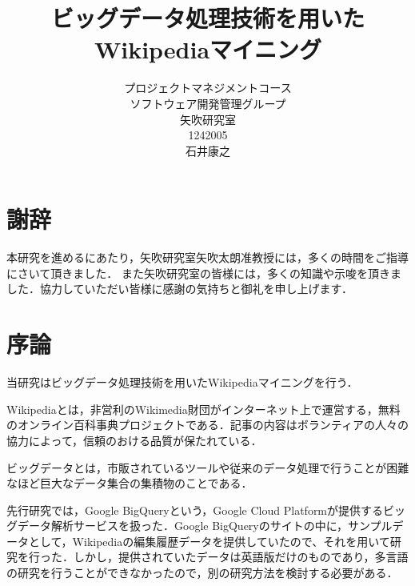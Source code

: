 \usepackage{here}

\title{ビッグデータ処理技術を用いた\\
Wikipediaマイニング}
\author{プロジェクトマネジメントコース\\
ソフトウェア開発管理グループ\\
矢吹研究室\\
1242005\\
石井康之}
\date{}

\maketitle



\chapter*{謝辞}

本研究を進めるにあたり，矢吹研究室矢吹太朗准教授には，多くの時間をご指導にさいて頂きました．
また矢吹研究室の皆様には，多くの知識や示唆を頂きました．協力していただい皆様に感謝の気持ちと御礼を申し上げます．

\tableofcontents%

\chapter{序論}

当研究はビッグデータ処理技術を用いたWikipediaマイニングを行う．

Wikipediaとは，非営利のWikimedia財団がインターネット上で運営する，無料のオンライン百科事典プロジェクトである．記事の内容はボランティアの人々の協力によって，信頼のおける品質が保たれている．

ビッグデータとは，市販されているツールや従来のデータ処理で行うことが困難なほど巨大なデータ集合の集積物のことである．

先行研究では，{Google BigQuery}という，{Google Cloud Platform}が提供するビッグデータ解析サービスを扱った．{Google BigQuery}のサイトの中に，サンプルデータとして，Wikipediaの編集履歴データを提供していたので、それを用いて研究を行った．しかし，提供されていたデータは英語版だけのものであり，多言語の研究を行うことができなかったので，別の研究方法を検討する必要がある．


